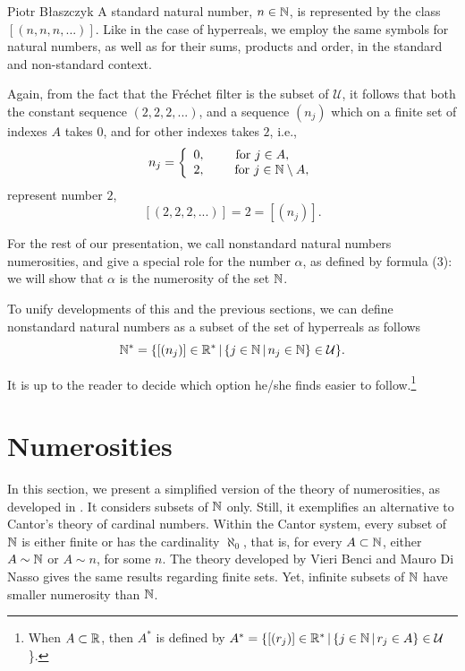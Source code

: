 \begin{artengenv}{Piotr Błaszczyk}
A standard natural number, $n\in{\mathbb{N}}$, is represented by the class $[(n,n,n,...)]$.
 Like in the case of hyperreals, we employ the same symbols for natural numbers, as well as for their sums, products and order, in the standard and non-standard context.


Again, from the fact that the Fr\'{e}chet filter is the subset of $\mathcal U$, it follows that both the constant sequence $(2,2,2,...)$, and a  sequence $(n_j)$  which on a finite set of indexes $A$ takes $0$, and for other indexes takes $2$,
i.e.,
\[n_j=
\left\{\begin{array}{cc}
0, & \mbox{for $j\in A$}, \\
2, & \mbox{\ \ \ \ \,for $j\in{\mathbb{N}}\setminus A$},
\end{array} \right.\]
represent number $2$,
\[[(2,2,2,...)]=2=[(n_j)].\]

For the rest of our presentation, we call nonstandard natural numbers numerosities,
 and  give a special role for  the number $\alpha$, as defined by formula (3): we will show that $\alpha$ is the numerosity of the set ${\mathbb{N}}$. 

To unify developments of this and the previous sections, we can define nonstandard natural numbers as a subset of the set of hyperreals as follows
\[{\mathbb{N}}^*=\{[(n_j)]\in{\mathbb{R}}^*\,|\, \{j\in{\mathbb{N}}\,|\,n_j\in{\mathbb{N}}\}\in\mathcal U\}.\]

It is up to the reader to decide which option he/she finds easier to follow.\footnote{When $A\subset {\mathbb{R}}$, then $A^*$
is defined by  $A^*=\{[(r_j)]\in{\mathbb{R}}^*\,|\, \{j\in{\mathbb{N}}\,|\,r_j\in A\}\in\mathcal U$\}. }

 




\section{Numerosities}
In this section, we present a simplified version of the theory of numerosities, as developed in \parencite{ref_BN19}. It considers subsets of ${\mathbb{N}}$ only.
Still, it exemplifies an alternative to  Cantor's theory of cardinal numbers. Within the Cantor system, every subset of ${\mathbb{N}}$ is either finite or has the cardinality $\aleph_0$, 
that is, for every $A\subset{\mathbb{N}}$, either $A\sim{\mathbb{N}}$ or $A\sim n$, for some $n$.
The theory developed by Vieri Benci and Mauro Di Nasso gives the same results regarding finite sets. Yet,  infinite subsets of ${\mathbb{N}}$  have smaller numerosity than ${\mathbb{N}}$.


\end{artengenv}
